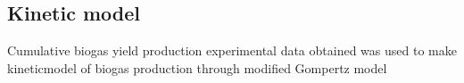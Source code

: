 \subsection{Kinetic model}
Cumulative biogas yield production experimental data obtained was used to make kineticmodel of biogas production through modified Gompertz
model